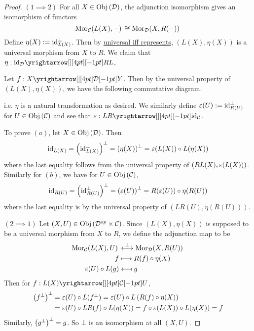 \begin{proof}
  $(1\implies 2)$
  For all $X \in \mathrm{Obj}\left(\mathcal{D}\right)$, 
  the adjunction isomorphism gives an isomorphism of functors
  \[
    \mathrm{Mor}_{\mathcal{C}}(L(X), -)\, \cong \mathrm{Mor}_{\mathcal{D}}(X, R(-))\,
  \]
  Define $\eta(X) := \mathrm{id}_{L(X)}^\bot$. 
  Then by \hyperlink{uni_iff_rep}{universal iff represents}, 
  $(L(X),\eta(X))$ is a universal morphism from $X$ to $R$. 
  We claim that $\eta : \map{\id{\DD}}{RL}{}{}$. 

  Let $f : \map{X}{Y}{\DD}{}$. 
  Then by the universal property of $(L(X),\eta(X))$,
  we have the following commutative diagram. 
  \begin{figure}[H]
    \centering
  \end{figure}
  i.e. $\eta$ is a natural transformation as desired. 
  We similarly define $\varepsilon(U) := \mathrm{id}_{R(U)}^\bot$ for $U \in \mathrm{Obj}\left(\mathcal{C}\right)$
  and see that $\ep : \map{LR}{\id{\CC}}{}{}$. 

  To prove $(a)$, let $X \in \mathrm{Obj}\left(\mathcal{D}\right)$. 
  Then \begin{align*}
    \mathrm{id}_{L(X)} 
    = \left(\mathrm{id}_{L(X)}^\bot\right)^\bot 
    = \left(\eta(X)\right)^\bot 
    = \varepsilon(L(X)) \circ L(\eta(X)) 
  \end{align*}
  where the last equality follows from 
  the universal property of $(RL(X),\varepsilon(L(X)))$. 
  Similarly for $(b)$, we have for $U \in \mathrm{Obj}\left(\mathcal{C}\right)$, 
  \begin{align*}
    \mathrm{id}_{R(U)} 
    = \left(\mathrm{id}_{R(U)}^\bot\right)^\bot 
    = \left(\varepsilon(U)\right)^\bot 
    = R(\varepsilon(U)) \circ \eta(R(U))
  \end{align*}
  where the last equality is by
  the universal property of $(LR(U),\eta(R(U)))$.

  $(2\implies 1)$ 
  Let $(X,U)\in\mathrm{Obj}\left(\mathcal{D}^{op} \times \mathcal{C}\right)$. 
  Since $(L(X),\eta(X))$ is supposed to be 
  a universal morphism from $X$ to $R$, 
  we define the adjunction map to be 
  \begin{align*}
    \mathrm{Mor}_{\mathcal{C}}(L(X), U)\, &\overset{\bot}{\longleftrightarrow} 
    \mathrm{Mor}_{\mathcal{D}}(X, R(U))\, \\
    f &\longmapsto R(f) \circ \eta(X) \\
    \varepsilon(U) \circ L(g) &\longmapsfrom g
  \end{align*}
  Then for $f : \map{L(X)}{U}{\CC}{}$, 
  \begin{align*}
    \left(f^\bot\right)^\bot 
    &= \varepsilon(U) \circ L(f^\bot) = \varepsilon(U) \circ L\left(R(f) \circ \eta(X)\right) \\
    &= \varepsilon(U) \circ LR(f) \circ L(\eta(X)) 
    = f \circ \varepsilon(L(X)) \circ L(\eta(X)) = f
  \end{align*}
  Similarly, $\left(g^\bot\right)^\bot = g$.
  So $\bot$ is an isomorphism at all $(X,U)$.
  

\end{proof}
